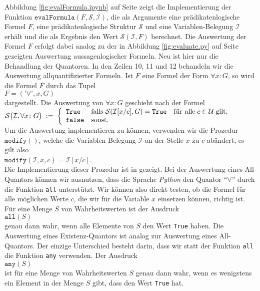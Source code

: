 Abbildung \ref{fig:evalFormula.ipynb} auf Seite \pageref{fig:evalFormula.ipynb} zeigt die Implementierung der
Funktion $\texttt{evalFormula}(F, \mathcal{S}, \mathcal{I})$, die als Argumente eine prädikatenlogische Formel
$F$, eine prädikatenlogische Struktur $\mathcal{S}$ und eine Variablen-Belegung $\mathcal{I}$ erhält und die
als Ergebnis den Wert $\mathcal{S}(\mathcal{I}, F)$ berechnet.
Die Auswertung der Formel $F$ erfolgt dabei analog zu der in Abbildung \ref{fig:evaluate.py} auf
Seite \pageref{fig:evaluate.py} gezeigten Auswertung aussagenlogischer Formeln.   Neu ist hier nur die
Behandlung der Quantoren.  In den Zeilen 10, 11 und 12 behandeln wir die Auswertung allquantifizierter Formeln.
Ist $F$ eine Formel der Form $\forall x: G$, so wird die Formel $F$ durch das Tupel
\\[0.2cm]
\hspace*{1.3cm}
$F = (\texttt{'∀'}, x, G)$
\\[0.2cm]
dargestellt.  Die Auswertung von $\forall x\colon G$ geschieht nach der Formel
\\[0.2cm]
\hspace*{1.3cm}
$\mathcal{S}\bigl(\mathcal{I}, \forall x\colon G\bigr) \;:=\; \left\{
      \begin{array}{ll}
         \mathtt{True}  & \mbox{falls}\; \mathcal{S}(\mathcal{I}[x/c], G) = \mathtt{True}\quad \mbox{für alle}\; c\in \mathcal{U}\;\mbox{gilt}; \\
         \mathtt{false} & \mbox{sonst}.
      \end{array}
      \right.
$
\\[0.2cm]
Um die Auswertung implementieren zu können, verwenden wir die Prozedur $\texttt{modify}()$, welche die
Variablen-Belegung $\mathcal{I}$ an der Stelle $x$ zu $c$ abändert, es gilt also
\\[0.2cm]
\hspace*{1.3cm}
$\texttt{modify}(\mathcal{I},x,c) = \mathcal{I}[x/c]$. 
\\[0.2cm]
Die Implementierung dieser Prozedur ist in  gezeigt.
 Bei der Auswertung eines All-Quantors können wir ausnutzen, dass die Sprache \textsl{Python}
den Quantor ``$\forall$'' durch die Funktion \texttt{all} unterstützt.  Wir können also direkt testen, ob die 
Formel für alle möglichen Werte $c$, die wir für die Variable $x$ einsetzen können,
richtig ist.  Für eine Menge $S$ von Wahrheitswerten ist der Ausdruck
\\[0.2cm]
\hspace*{1.3cm}
$\texttt{all}(S)$
\\[0.2cm]
genau dann wahr, wenn alle Elemente von $S$ den Wert \texttt{True} haben.
Die Auswertung eines Existenz-Quantors ist analog zur Auswertung eines All-Quantors.
Der einzige Unterschied besteht darin, dass wir statt der Funktion \texttt{all} die Funktion \texttt{any}
verwenden.  Der Ausdruck
\\[0.2cm]
\hspace*{1.3cm}
$\texttt{any}(S)$
\\[0.2cm]
ist für eine Menge von Wahrheitswerten $S$ genau dann wahr, wenn es wenigstens ein Element in der Menge $S$
gibt, dass den Wert \texttt{True} hat.

